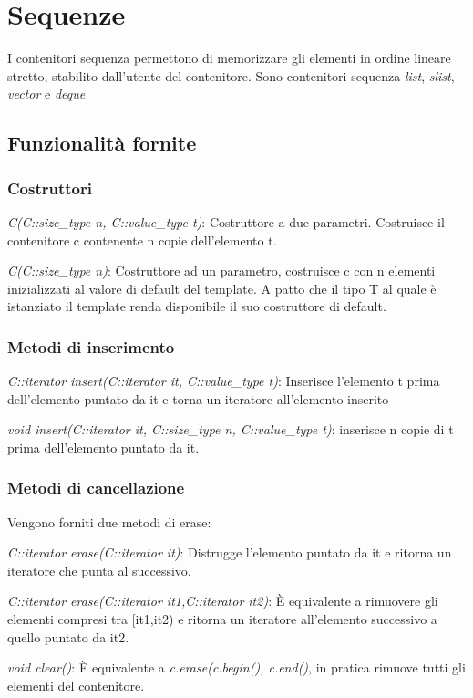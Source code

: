 \section{Sequenze}
I contenitori sequenza permettono di memorizzare gli elementi in ordine lineare stretto, stabilito dall'utente del contenitore. Sono contenitori sequenza \textit{list}, \textit{slist}, \textit{vector} e \textit{deque}

\subsection{Funzionalità fornite}

\subsubsection{Costruttori}

\begin{description}
	\item \textit{C(C::size\_type n, C::value\_type t)}: Costruttore a due parametri. Costruisce il contenitore c contenente n copie dell'elemento t.
	\item \textit{C(C::size\_type n)}: Costruttore ad un parametro, costruisce c con n elementi inizializzati al valore di default del template. A patto che il tipo T al quale è istanziato il template renda disponibile il suo costruttore di default.
\end{description}

\subsubsection{Metodi di inserimento}

\begin{description}
	\item \textit{C::iterator insert(C::iterator it, C::value\_type t)}: Inserisce l'elemento t prima dell'elemento puntato da it e torna un iteratore all'elemento inserito
	\item \textit{void insert(C::iterator it, C::size\_type n, C::value\_type t)}: inserisce n copie di t prima dell'elemento puntato da it.
\end{description}

\subsubsection{Metodi di cancellazione}
Vengono forniti due metodi di erase:

\begin{description}
	\item \textit{C::iterator erase(C::iterator it)}: Distrugge l'elemento puntato da it e ritorna un iteratore che punta al successivo.
	\item \textit{C::iterator erase(C::iterator it1,C::iterator it2)}: \`{E} equivalente a rimuovere gli elementi compresi tra [it1,it2) e ritorna un iteratore all'elemento successivo a quello puntato da it2.
	\item \textit{void clear()}: \`{E} equivalente a \textit{c.erase(c.begin(), c.end()}, in pratica rimuove tutti gli elementi del contenitore.
\end{description}

